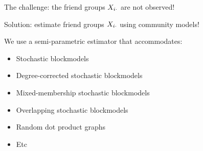 \documentclass[aspectratio=169]{beamer}
\theoremstyle{remark}
\begin{document}
\begin{frame}{The challenge: the friend groups $X_{i \cdot}$ are not observed!}

    Solution: estimate friend groups $X_{i \cdot}$ using community models!

    We use a semi-parametric estimator that accommodates:

    \begin{itemize}
        \item Stochastic blockmodels
        \item Degree-corrected stochastic blockmodels
        \item Mixed-membership stochastic blockmodels
        \item Overlapping stochastic blockmodels
        \item Random dot product graphs
        \item Etc
    \end{itemize}

\end{frame}
\end{document}
